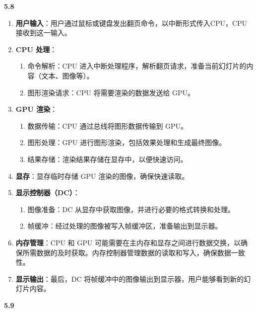 \documentclass[UTF8]{report}
\begin{document}
\noindent
\textbf{5.8}
\begin{enumerate}
    \item \textbf{用户输入}：用户通过鼠标或键盘发出翻页命令，以中断形式传入CPU，CPU 接收到这一输入。

    \item \textbf{CPU 处理}：
    \begin{enumerate}
        \item 命令解析：CPU 进入中断处理程序，解析翻页请求，准备当前幻灯片的内容（文本、图像等）。
        \item 图形渲染请求：CPU 将需要渲染的数据发送给 GPU。
    \end{enumerate}

    \item \textbf{GPU 渲染}：
    \begin{enumerate}
        \item 数据传输：CPU 通过总线将图形数据传输到 GPU。
        \item 图形处理：GPU 进行图形渲染，包括效果处理和生成最终图像。
        \item 结果存储：渲染结果存储在显存中，以便快速访问。
    \end{enumerate}

    \item \textbf{显存}：显存临时存储 GPU 渲染的图像，确保快速读取。

    \item \textbf{显示控制器（DC）}：
    \begin{enumerate}
        \item 图像准备：DC 从显存中获取图像，并进行必要的格式转换和处理。
        \item 帧缓冲：经过处理的图像被写入帧缓冲区，准备输出到显示器。
    \end{enumerate}

    \item \textbf{内存管理}：CPU 和 GPU 可能需要在主内存和显存之间进行数据交换，以确保所需数据的及时获取。内存控制器管理数据的读取和写入，确保数据一致性。

    \item \textbf{显示输出}：最后，DC 将帧缓冲中的图像输出到显示器，用户能够看到新的幻灯片内容。
\end{enumerate}

\noindent
\textbf{5.9}
\end{document}
